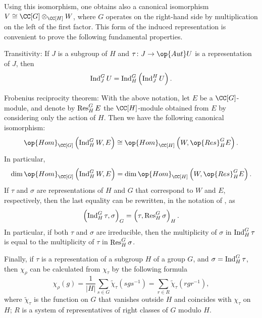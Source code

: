 \documentclass[../main.tex]{subfiles}
\begin{document}
Using this isomorphism, one obtains also a canonical isomorphism $V\cong\CC[G]\otimes_{\CC[H]}W$, where $G$ operates on the right-hand side by multiplication on the left of the first factor. This form of the induced representation is convenient to prove the following fundamental properties.
\begin{listalph}
	\item Transitivity: If $J$ is a subgroup of $H$ and $\tau\colon J\to\op{Aut}U$ is a representation of $J$, then
	\[\operatorname{Ind}^G_JU=\operatorname{Ind}^G_H\left(\operatorname{Ind}^H_JU\right).\]
	\item Frobenius reciprocity theorem: With the above notation, let $E$ be a $\CC[G]$-module, and denote by $\operatorname{Res}^G_HE$ the $\CC[H]$-module obtained from $E$ by considering only the action of $H$. Then we have the following canonical isomorphism:
	\[\op{Hom}_{\CC[G]}\left(\Ind^G_HW,E\right)\cong\op{Hom}_{\CC[H]}\left(W,\op{Res}^G_HE\right).\]
	In particular,
	\[\dim\op{Hom}_{\CC[G]}\left(\Ind^G_HW,E\right)=\dim\op{Hom}_{\CC[H]}\left(W,\op{Res}^G_HE\right).\]
	If $\tau$ and $\sigma$ are representations of $H$ and $G$ that correspond to $W$ and $E$, respectively, then the last equality can be rewritten, in the notation of , as
	\[\left(\operatorname{Ind}^G_H\tau,\sigma\right)_G=\left(\tau,\operatorname{Res}^G_H\sigma\right)_H.\]
	In particular, if both $\tau$ and $\sigma$ are irreducible, then the multiplicity of $\sigma$ in $\operatorname{Ind}^G_H\tau$ is equal to the multiplicity of $\tau$ in $\operatorname{Res}^G_H\sigma$.
\end{listalph}
Finally, if $\tau$ is a representation of a subgroup $H$ of a group $G$, and $\sigma=\operatorname{Ind}^G_H\tau$, then $\chi_\rho$ can be calculated from $\chi_\tau$ by the following formula
\[\chi_\rho(g)=\frac1{|H|}\sum_{s\in G}\widetilde\chi_\tau\left(sgs^{-1}\right)=\sum_{r\in R}\widetilde\chi_\tau\left(rgr^{-1}\right),\]
where $\widetilde\chi_\tau$ is the function on $G$ that vanishes outside $H$ and coincides with $\chi_\tau$ on $H$; $R$ is a system of representatives of right classes of $G$ modulo $H$.
\end{document}
